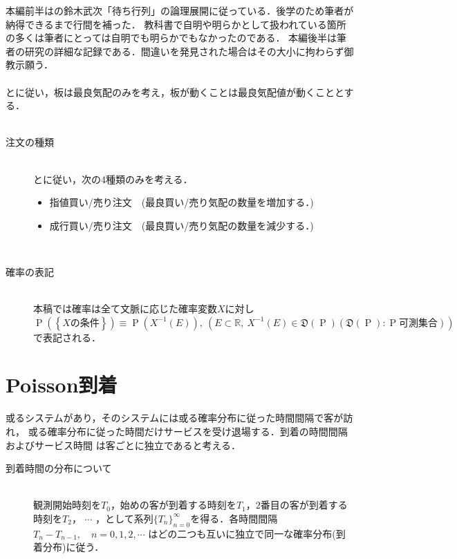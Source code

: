 \documentclass[a4j,papersize,disablejfam,slide,14pt]{jsarticle}
\def\prob#1{\operatorname{P} \left(\left\{ #1 \right\}\right)} %
\begin{document}
    本編前半は\cite{suzuki_queueing}の鈴木武次「待ち行列」の論理展開に従っている．後学のため筆者が納得できるまで行間を補った．
    教科書で自明や明らかとして扱われている箇所の多くは筆者にとっては自明でも明らかでもなかったのである．
    本編後半は筆者の研究の詳細な記録である．間違いを発見された場合はその大小に拘わらず御教示願う．\\
    \mbox{}\\
    \cite{endo_zuo_kishimoto}と\cite{li_hui_endo_kishimoto}に従い，板は最良気配のみを考え，板が動くことは最良気配値が動くこととする．\\
    \mbox{}\\
    \begin{description}
    	\item[注文の種類]\mbox{}\\
     	\cite{endo_zuo_kishimoto}と\cite{li_hui_endo_kishimoto}に従い，次の4種類のみを考える．
    	\begin{itemize}
    		\item 指値買い/売り注文　(最良買い/売り気配の数量を増加する．)
        	\item 成行買い/売り注文　(最良買い/売り気配の数量を減少する．)
    	\end{itemize}
        \mbox{}\\
        \item[確率の表記]\mbox{}\\
        	本稿では確率は全て文脈に応じた確率変数$X$に対し$\prob{\mbox{$X$の条件}} \equiv \operatorname{P}(X^{-1}(E)),
            \ (E \subset \mathbb{R},\ X^{-1}(E) \in \mathfrak{D}(\operatorname{P})(\mathfrak{D}(\operatorname{P}):\operatorname{P}\mbox{可測集合}))$で表記される．
     \end{description}

\section{{\rm Poisson}到着}
    \begin{screen}
    或るシステムがあり，そのシステムには或る確率分布に従った時間間隔で客が訪れ，
    或る確率分布に従った時間だけサービスを受け退場する．到着の時間間隔およびサービス時間
    は客ごとに独立であると考える．
    \end{screen}
    \begin{description}
    	\item[到着時間の分布について]\mbox{}\\
    	観測開始時刻を$T_0$，始めの客が到着する時刻を$T_1$，$2$番目の客が到着する時刻を$T_2$，
    	$\cdots$ ，として系列$\{T_n\}_{n=0}^{\infty}$を得る．各時間間隔$T_n - T_{n-1},\quad n=0,1,2,\cdots$
    	はどの二つも互いに独立で同一な確率分布(到着分布)に従う．
    \end{description}
\end{document}
